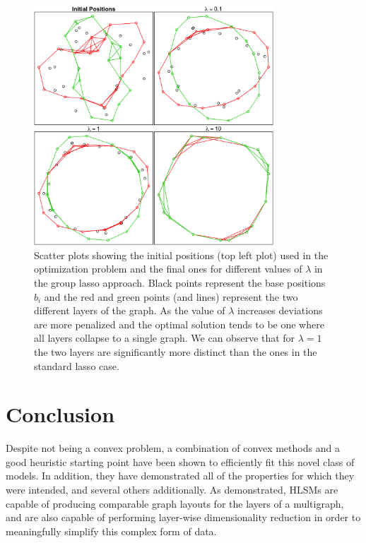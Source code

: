 \documentclass{article}
\begin{document}
\begin{figure}[h!]
   \centering
   \includegraphics[width=0.8\textwidth]{plot_positions_group} %
   \caption{Scatter plots showing the initial positions (top left plot) used in the optimization problem and the final ones for different values of $\lambda$ in the group lasso approach. Black points represent the base positions $b_i$ and the red and green points (and lines) represent the two different layers of the graph. As the value of $\lambda$ increases deviations are more penalized and the optimal solution tends to be one where all layers collapse to a single graph. We can observe that for $\lambda=1$ the two layers are significantly more distinct than the ones in the standard lasso case.}
   \label{fig:pos_group}
\end{figure}


\section{Conclusion}

Despite not being a convex problem, a combination of convex methods and a good heuristic starting point have been shown to efficiently fit this novel class of models. In addition, they have demonstrated all of the properties for which they were intended, and several others additionally. As demonstrated, HLSMs are capable of producing comparable graph layouts for the layers of a multigraph, and are also capable of performing layer-wise dimensionality reduction in order to meaningfully simplify this complex form of data.
\end{document}
